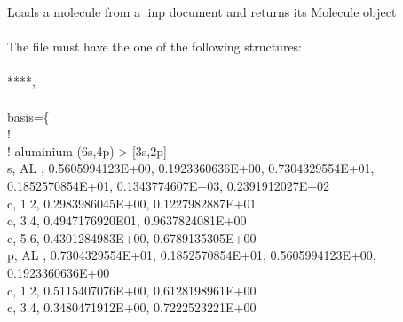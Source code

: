 \documentclass[letterpaper,10pt,english]{sphinxmanual}
\begin{document}
\begin{fulllineitems}
\begin{fulllineitems}
\label{\detokenize{MolOpt.molecular:MolOpt.molecular.molecular.Molecule.load}}
\sphinxAtStartPar
Loads a molecule from a .inp document and returns its Molecule object
 \\
 \\The file must have the one of the following structures:
 \\
 \\****,
 \\
 \\basis=\{
 \\!
 \\! aluminium            (6s,4p) \sphinxhyphen{}\textgreater{} {[}3s,2p{]}
 \\s, AL , 0.5605994123E+00, 0.1923360636E+00, 0.7304329554E+01, 0.1852570854E+01, 0.1343774607E+03, 0.2391912027E+02
 \\c, 1.2, \sphinxhyphen{}0.2983986045E+00, 0.1227982887E+01
 \\c, 3.4, 0.4947176920E\sphinxhyphen{}01, 0.9637824081E+00
 \\c, 5.6, 0.4301284983E+00, 0.6789135305E+00
 \\p, AL , 0.7304329554E+01, 0.1852570854E+01, 0.5605994123E+00, 0.1923360636E+00
 \\c, 1.2, 0.5115407076E+00, 0.6128198961E+00
 \\c, 3.4, 0.3480471912E+00, 0.7222523221E+00

\end{fulllineitems}
\end{fulllineitems}
\end{document}
